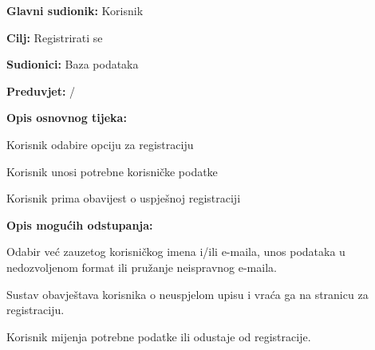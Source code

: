 				
				\noindent {}
				\begin{packed_item}
	
						\item \textbf{Glavni sudionik: }Korisnik
						\item  \textbf{Cilj:} Registrirati se
						\item  \textbf{Sudionici:} Baza podataka
						\item  \textbf{Preduvjet:} /
						\item  \textbf{Opis osnovnog tijeka:}
						
						\item[] \begin{packed_enum}
	
							\item Korisnik odabire opciju za registraciju
							\item Korisnik unosi potrebne korisničke podatke
							\item Korisnik prima obavijest o uspješnoj registraciji
						\end{packed_enum}
					
					\item  \textbf{Opis mogućih odstupanja:}
						
						\item[] \begin{packed_item}
	
							\item[1.a] Odabir već zauzetog korisničkog imena i/ili e-maila, unos podataka u        nedozvoljenom format ili pružanje neispravnog e-maila.
							\item[] \begin{packed_enum}
								
								\item  Sustav obavještava korisnika o neuspjelom upisu i vraća ga na stranicu za registraciju.
								\item Korisnik mijenja potrebne podatke ili odustaje od registracije.

							\end{packed_enum}
						\end{packed_item}						
				\end{packed_item}

